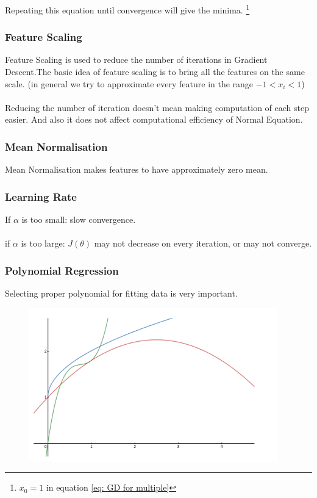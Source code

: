 \documentclass[12pt, A4]{report}
\begin{document}
    Repeating this equation until convergence will give the minima. \footnote[1]{$x_0 = 1$ in equation \ref{eq: GD for multiple}}

  \subsubsection*{Feature Scaling}
    Feature Scaling is used to reduce the number of iterations in Gradient Descent.The basic idea of feature scaling is to bring all the features on the same scale. (in general we try to approximate every feature in the range $ -1 < x_i < 1 $)
    \\ \\ Reducing the number of iteration doesn't mean making computation of each step easier. And also it does not affect computational efficiency of Normal Equation.

  \subsubsection*{Mean Normalisation}
    Mean Normalisation makes features to have approximately zero mean.

  \subsubsection*{Learning Rate}
    If $\alpha$ is too small: slow convergence.\\ \\
    if $\alpha$ is too large: $J(\theta)$ may not decrease on every iteration, or may not converge.

  \subsubsection*{Polynomial Regression}
    Selecting proper polynomial for fitting data is very important.

    \begin{figure}[h]
        \includegraphics[scale = 0.6]{polyreg.png}
    \end{figure}
\end{document}
